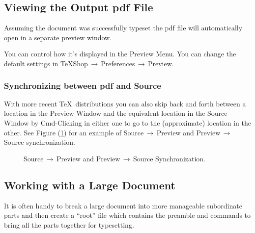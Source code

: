 \documentclass[letterpaper,11pt]{article}
\newcommand{\acr}[1]{\textsf{#1}}
\newcommand{\cmd}[1]{\textsf{#1}}
\newcommand{\mnu}[1]{\textsf{#1}}
\newcommand{\To}{\,\(\to\)\,}
\begin{document}
\subsection{Viewing the Output \acr{pdf} File}

Assuming the document was successfully typeset the \acr{pdf} file will automatically open in a separate preview window.

You can control how it's displayed in the \mnu{Preview} Menu. You can change the default settings in \mnu{TeXShop}\To\mnu{Preferences}\To\mnu{Preview}.

\subsubsection{Synchronizing between \acr{pdf} and Source}

With more recent \TeX\ distributions you can also skip back and forth between a location in the Preview Window and the equivalent location in the Source Window by \cmd{Cmd-Clicking} in either one to go to the (approximate) location in the other. See Figure (\ref{fig:SourcePreviewSync}) for an example of Source\To Preview and Preview\To Source synchronization.

\begin{figure}
\centering
{}\qquad{}
\caption{Source\protect\To Preview and Preview\protect\To Source Synchronization.}
\label{fig:SourcePreviewSync}
\end{figure}

\subsection{Working with a Large Document}

It is often handy to break a large document into more manageable subordinate parts and then create a ``root'' file which contains the preamble and \verb|| commands to bring all the parts together for typesetting.
\end{document}
